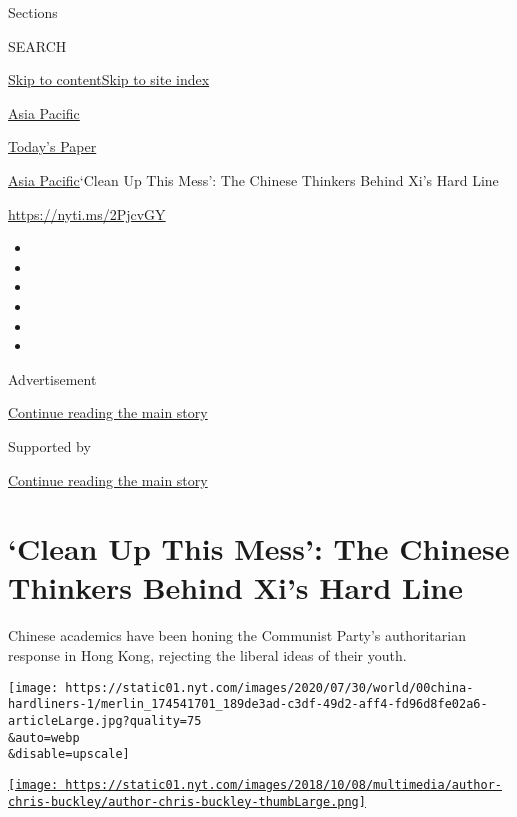 Sections

SEARCH

\protect\hyperlink{site-content}{Skip to
content}\protect\hyperlink{site-index}{Skip to site index}

\href{https://www.nytimes.com/section/world/asia}{Asia Pacific}

\href{https://myaccount.nytimes.com/auth/login?response_type=cookie\&client_id=vi}{}

\href{https://www.nytimes.com/section/todayspaper}{Today's Paper}

\href{/section/world/asia}{Asia Pacific}\textbar{}`Clean Up This Mess':
The Chinese Thinkers Behind Xi's Hard Line

\url{https://nyti.ms/2PjcvGY}

\begin{itemize}
\item
\item
\item
\item
\item
\item
\end{itemize}

Advertisement

\protect\hyperlink{after-top}{Continue reading the main story}

Supported by

\protect\hyperlink{after-sponsor}{Continue reading the main story}

\hypertarget{clean-up-this-mess-the-chinese-thinkers-behind-xis-hard-line}{%
\section{`Clean Up This Mess': The Chinese Thinkers Behind Xi's Hard
Line}\label{clean-up-this-mess-the-chinese-thinkers-behind-xis-hard-line}}

Chinese academics have been honing the Communist Party's authoritarian
response in Hong Kong, rejecting the liberal ideas of their youth.

\texttt{[image: https://static01.nyt.com/images/2020/07/30/world/00china-hardliners-1/merlin\_174541701\_189de3ad-c3df-49d2-aff4-fd96d8fe02a6-articleLarge.jpg?quality=75\\\&auto=webp\\\&disable=upscale]}

\href{https://www.nytimes.com/by/chris-buckley}{\texttt{[image: https://static01.nyt.com/images/2018/10/08/multimedia/author-chris-buckley/author-chris-buckley-thumbLarge.png]}}

